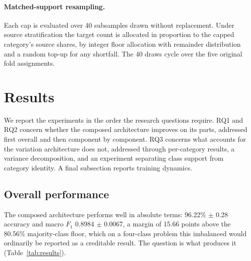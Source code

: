 \documentclass[11pt,a4paper]{article}
\begin{document}
\paragraph{Matched-support resampling.} Each cap is evaluated over 40 subsamples drawn without
replacement. Under source stratification the target count is allocated in proportion to the capped
category's source shares, by integer floor allocation with remainder distribution and a random top-up for
any shortfall. The 40 draws cycle over the five original fold assignments.

\section{Results}
\label{sec:results}

We report the experiments in the order the research questions require. RQ1 and RQ2 concern whether the composed architecture improves on its parts, addressed first overall and then component by component. RQ3 concerns what accounts for the variation architecture does not, addressed through per-category results, a variance decomposition, and an experiment separating class support from category identity. A final subsection reports training dynamics.

\subsection{Overall performance}

The composed architecture performs well in absolute terms: 96.22\% $\pm$ 0.28 accuracy and
macro $F_1$ 0.8984 $\pm$ 0.0067, a margin of 15.66 points above the 80.56\% majority-class
floor, which on a four-class problem this imbalanced would ordinarily be reported as a
creditable result. The question is what produces it (Table~\ref{tab:results}).
\end{document}
